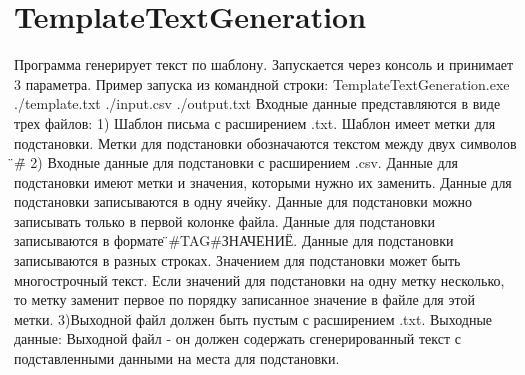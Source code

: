 \chapter{Template\+Text\+Generation}
\hypertarget{md__r_e_a_d_m_e}{}\label{md__r_e_a_d_m_e}
\label{md__r_e_a_d_m_e_autotoc_md0}%
%
Программа генерирует текст по шаблону. Запускается через консоль и принимает 3 параметра. Пример запуска из командной строки\+: Template\+Text\+Generation.\+exe ./template.txt ./input.csv ./output.txt Входные данные представляются в виде трех файлов\+: 1) Шаблон письма с расширением .txt. Шаблон имеет метки для подстановки. Метки для подстановки обозначаются текстом между двух символов \"{}\#\"{} 2) Входные данные для подстановки с расширением .csv. Данные для подстановки имеют метки и значения, которыми нужно их заменить. Данные для подстановки записываются в одну ячейку. Данные для подстановки можно записывать только в первой колонке файла. Данные для подстановки записываются в формате \"{}\#\+TAG\#ЗНАЧЕНИЕ\"{}. Данные для подстановки записываются в разных строках. Значением для подстановки может быть многострочный текст. Если значений для подстановки на одну метку несколько, то метку заменит первое по порядку записанное значение в файле для этой метки. 3)Выходной файл должен быть пустым с расширением .txt. Выходные данные\+: Выходной файл -\/ он должен содержать сгенерированный текст с подставленными данными на места для подстановки. 